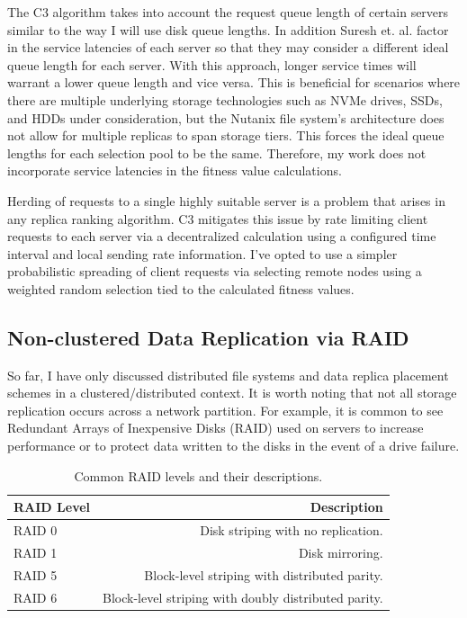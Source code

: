 \documentclass[12pt]{article}
\begin{document}
  The C3 algorithm takes into account the request queue length of certain
  servers similar to the way I will use disk queue lengths. In addition Suresh
  et. al.  factor in the service latencies of each server so that they may
  consider a different ideal queue length for each server. With this approach,
  longer service times will warrant a lower queue length and vice versa. This
  is beneficial for scenarios where there are multiple underlying storage
  technologies such as NVMe drives, SSDs, and HDDs under consideration, but the
  Nutanix file system's architecture does not allow for multiple replicas to
  span storage tiers. This forces the ideal queue lengths for each selection
  pool to be the same. Therefore, my work does not incorporate service
  latencies in the fitness value calculations.

  Herding of requests to a single highly suitable server is a problem that
  arises in any replica ranking algorithm. C3 mitigates this issue by rate
  limiting client requests to each server via a decentralized calculation using
  a configured time interval and local sending rate information. I've opted to
  use a simpler probabilistic spreading of client requests via selecting remote
  nodes using a weighted random selection tied to the calculated fitness
  values.

  \subsection{Non-clustered Data Replication via RAID}

  So far, I have only discussed distributed file systems and data replica
  placement schemes in a clustered/distributed context. It is worth noting
  that not all storage replication occurs across a network partition. For
  example, it is common to see Redundant Arrays of Inexpensive Disks (RAID)
  \cite{raid} \cite{raid2} used on servers to increase performance or to
  protect data written to the disks in the event of a drive failure.

  \begin{table}[htbp]
    \caption{Common RAID levels and their descriptions.}
    \label{tbl:raid-levels}
    \begin{center}
    \begin{tabular}{ | l | r | }
      \hline
      RAID Level & Description \\ \hline
      RAID 0 & Disk striping with no replication. \\ \hline
      RAID 1 & Disk mirroring. \\ \hline
      RAID 5 & Block-level striping with distributed parity. \\ \hline
      RAID 6 & Block-level striping with doubly distributed parity. \\ \hline
      \hline
    \end{tabular}
    \end{center}
  \end{table}
\end{document}

